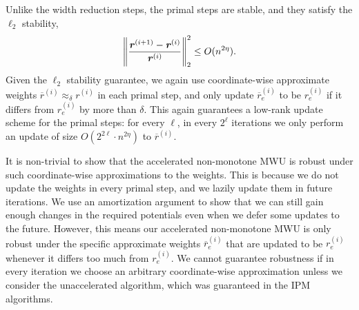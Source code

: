 \documentclass[11pt]{article}
\let\originalleft\left
\let\originalright\right
\renewcommand{\left}{\mathopen{}\mathclose\bgroup\originalleft}
\renewcommand{\right}{\aftergroup\egroup\originalright}
\newcommand\rr{\boldsymbol{\mathit{r}}}
\newcommand{\ov}{\overline}
\begin{document}
Unlike the width reduction steps, the primal steps are stable, and they satisfy the $\ell_2$ stability,
\[
\left\|\frac{\rr^{(i+1)} - \rr^{(i)}}{\rr^{(i)}}\right\|_2^2 \leq O(n^{2 \eta}).
\]
Given the $\ell_2$ stability guarantee, we again use coordinate-wise approximate weights $\ov{\rr}^{(i)} \approx_{\delta} \rr^{(i)}$ in each primal step, and only update $\ov{\rr}^{(i)}_e$ to be $\rr^{(i)}_e$ if it differs from $\rr^{(i)}_e$ by more than $\delta$. This again guarantees a low-rank update scheme for the primal steps: for every $\ell$, in every $2^{\ell}$ iterations we only perform an update of size $O(2^{2 \ell} \cdot n^{2 \eta})$ to $\ov{\rr}^{(i)}$. 

It is non-trivial to show that the accelerated non-monotone MWU is robust under such coordinate-wise approximations to the weights. This is because we do not update the weights in every primal step, and we lazily update them in future iterations. We use an amortization argument to show that we can still gain enough changes in the required potentials even when we defer some updates to the future. However, this means our accelerated non-monotone MWU is only robust under the specific approximate weights $\ov{\rr}^{(i)}_e$ that are updated to be $\rr^{(i)}_e$ whenever it differs too much from $\rr^{(i)}_e$. We cannot guarantee robustness if in every iteration we choose an arbitrary coordinate-wise approximation unless we consider the unaccelerated algorithm, which was guaranteed in the IPM algorithms.
\end{document}

